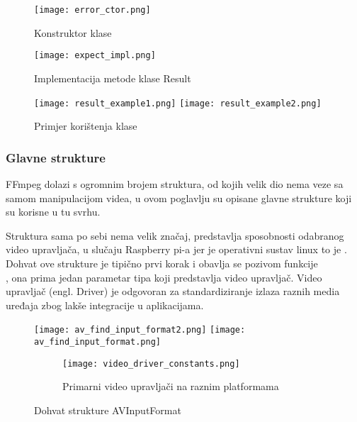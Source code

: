 \begin{figure}[h]
  \texttt{[image: error\_ctor.png]}
  \caption[Konstruktor klase Error]{Konstruktor klase }
\end{figure}
\begin{figure}[h]
  \texttt{[image: expect\_impl.png]}
  \caption[Klasa Result implementacija]{Implementacija metode  klase Result}
\end{figure}
\begin{figure}[h]
  \texttt{[image: result\_example1.png]}
  \texttt{[image: result\_example2.png]}
  \caption[Primjer korištenja klase Result]{Primjer korištenja klase }
  \label{pic:result_example}
\end{figure}


\clearpage
\subsubsection{Glavne strukture}
FFmpeg dolazi s ogromnim brojem struktura, od kojih velik dio nema veze sa samom manipulacijom videa,
u ovom poglavlju su opisane glavne strukture koji su korisne u tu svrhu.

{} \label{sec:input_format}
Struktura  sama po sebi nema velik značaj, predstavlja sposobnosti odabranog video upravljača, u
slučaju Raspberry pi-a jer je operativni sustav linux to je \hyperref[sct:v4l2]{}. \cite{ffmpegDocs} \cite{linuxKernelDocs}
\paraBreak
Dohvat ove strukture je tipično prvi korak i obavlja se pozivom funkcije \\
, ona prima jedan parametar tipa  koji predstavlja video upravljač.
Video upravljač (engl. Driver) je odgovoran za standardiziranje izlaza raznih media uređaja zbog lakše integracije u
aplikacijama.
\begin{figure}[h]
  \texttt{[image: av\_find\_input\_format2.png]}
  \texttt{[image: av\_find\_input\_format.png]}
  \begin{subfigure}{\textwidth}
    \texttt{[image: video\_driver\_constants.png]}
    \caption{Primarni video upravljači na raznim platformama}
  \end{subfigure}
  \caption{Dohvat strukture AVInputFormat}
\end{figure}

